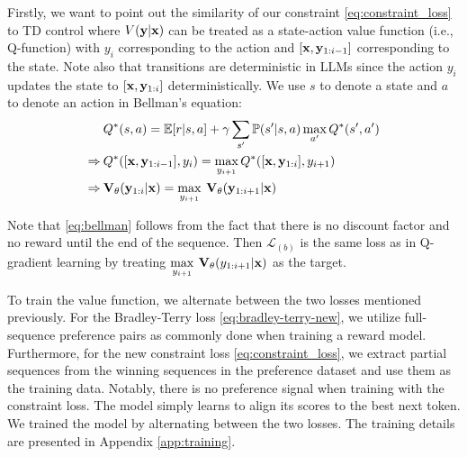 Firstly, we want to point out the similarity of our constraint \eqref{eq:constraint_loss} to TD control where $V({\mathbf{y}}|{\mathbf{x}})$ can be treated as a state-action value function (i.e., Q-function) with $y_i$ corresponding to the action and $[{\mathbf{x}},{\mathbf{y}}_{1:i-1}]$ corresponding to the state. Note also that transitions are deterministic in LLMs since the action $y_i$ updates the state to $[{\mathbf{x}},{\mathbf{y}}_{1:i}]$ deterministically.  We use $s$ to denote a state and $a$ to denote an action in Bellman's equation:
    $$
    \begin{aligned}
        &Q^{*}(s,a) = \mathbb{E}[r|s,a] + \gamma \sum_{s'}\mathbb{P}(s'|s,a) \max_{a'} Q^{*}(s', a')\\
        \Rightarrow \: &Q^{*}([{\mathbf{x}},{\mathbf{y}}_{1:i-1}], y_i) = \max_{y_{i+1}} Q^{*}([{\mathbf{x}},{\mathbf{y}}_{1:i}], y_{i+1}) \label{eq:bellman}\\
        \Rightarrow \: &\mathbf{V}_{\theta}({\mathbf{y}}_{1:i}|{\mathbf{x}}) = \max_{y_{i+1}} \: \mathbf{V}_{\theta}({\mathbf{y}}_{1:i+1}|{\mathbf{x}})
    \end{aligned}
    $$

Note that \cref{eq:bellman} follows from the fact that there is no discount factor and no reward until the end of the sequence.
Then $\mathcal{L}_{(b)}$ is the same loss as in Q-gradient learning by treating $\max\limits_{y_{i+1}} \:\mathbf{V}_{\theta}(y_{1:i+1}|{\mathbf{x}})$ as the target. 

To train the value function, we alternate between the two losses mentioned previously. For the Bradley-Terry loss \eqref{eq:bradley-terry-new}, we utilize full-sequence preference pairs as commonly done when training a reward model. Furthermore, for the new constraint loss \eqref{eq:constraint_loss}, we extract partial sequences from the winning sequences in the preference dataset and use them as the training data. Notably, there is no preference signal when training with the constraint loss. The model simply learns to align its scores to the best next token. We trained the model by alternating between the two losses. The training details are presented in Appendix \ref{app:training}.


